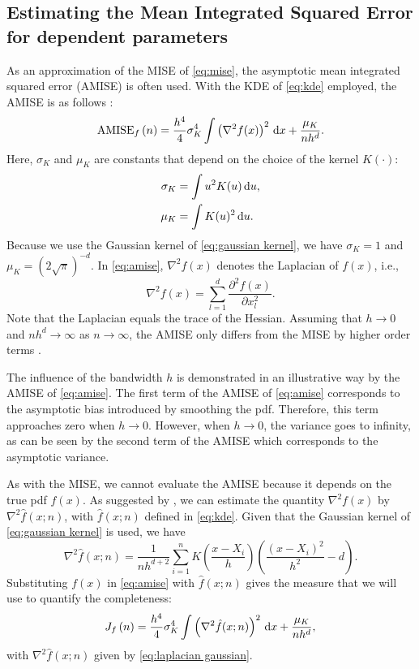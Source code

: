 \subsection{Estimating the Mean Integrated Squared Error for dependent parameters}
\label{sec:mise dependent}

As an approximation of the MISE of \cref{eq:mise}, the asymptotic mean integrated squared error (AMISE) is often used. With the KDE of \cref{eq:kde} employed, the AMISE is as follows \cite{marron1992exact}:
\begin{equation}
	\label{eq:amise}
	\textup{AMISE}_{f} \left( n \right) = \frac{h^4}{4} \sigma_K^4 \int \left( \nabla^2 f(x) \right)^2 \mathrm{\,d} x + \frac{\mu_K}{nh^d}.
\end{equation}
Here, $\sigma_K$ and $\mu_K$ are constants that depend on the choice of the kernel $K(\cdot)$:
\begin{align}
	\sigma_K &= \int u^2 K(u) \mathrm{\,d} u, \\
	\mu_K &= \int K(u)^2 \mathrm{\,d} u.
\end{align}
Because we use the Gaussian kernel of \cref{eq:gaussian kernel}, we have $\sigma_K=1$ and $\mu_K=(2\sqrt{\pi})^{-d}$. In \cref{eq:amise}, $\nabla^2 f(x)$ denotes the Laplacian of $f(x)$, i.e., 
\begin{equation}
	\nabla^2 f(x) = \sum_{l=1}^d \frac{\partial^2 f(x)}{\partial x_l^2}.
\end{equation}
Note that the Laplacian equals the trace of the Hessian. Assuming that $h \rightarrow 0$ and $nh^d \rightarrow \infty$ as $n \rightarrow \infty$, the AMISE only differs from the MISE by higher order terms \cite{silverman1986density}.

The influence of the bandwidth $h$ is demonstrated in an illustrative way by the AMISE of \cref{eq:amise}. The first term of the AMISE of \cref{eq:amise} corresponds to the asymptotic bias introduced by smoothing the pdf. Therefore, this term approaches zero when $h \rightarrow 0$. However, when $h \rightarrow 0$, the variance goes to infinity, as can be seen by the second term of the AMISE which corresponds to the asymptotic variance. 

As with the MISE, we cannot evaluate the AMISE because it depends on the true pdf $f(x)$. As suggested by \textcite{chen2017tutorial, calonico2018effect}, we can estimate the quantity $\nabla^2 f(x)$ by $\nabla^2 \hat{f}(x;n)$, with $\hat{f}(x;n)$ defined in \cref{eq:kde}. Given that the Gaussian kernel of \cref{eq:gaussian kernel} is used, we have
\begin{equation}
	\label{eq:laplacian gaussian}
	\nabla^2 \hat{f}(x;n) = \frac{1}{nh^{d+2}} \sum_{i=1}^n K\left( \frac{x - X_i}{h} \right) \left( \frac{\left(x-X_i\right)^2}{h^2} - d \right).
\end{equation}
Substituting $f(x)$ in \cref{eq:amise} with $\hat{f}(x;n)$ gives the measure that we will use to quantify the completeness:
\begin{equation}
	\label{eq:measure}
	J_{f} \left( n \right) = \frac{h^4}{4} \sigma_K^4 \int \left( \nabla^2 \hat{f}(x;n) \right)^2 \mathrm{\,d} x + \frac{\mu_K}{nh^d},
\end{equation}
with $\nabla^2\hat{f}(x;n)$ given by \cref{eq:laplacian gaussian}.

